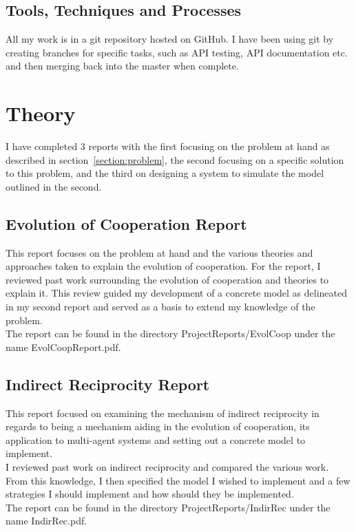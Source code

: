\documentclass[]{final_report}
\begin{document}
\subsection{Tools, Techniques and Processes}
All my work is in a git repository hosted on GitHub. I have been using git by creating branches for specific tasks, such as API testing, API documentation etc. and then merging back into the master when complete.\\

\section{Theory}
I have completed 3 reports with the first focusing on the problem at hand as described in section~\ref{section:problem}, the second focusing on a specific solution to this problem, and the third on designing a system to simulate the model outlined in the second.

\subsection{Evolution of Cooperation Report}
\label{sub:evolcoop}
This report focuses on the problem at hand and the various theories and approaches taken to explain the evolution of cooperation. For the report, I reviewed past work surrounding the evolution of cooperation and theories to explain it. This review guided my development of a concrete model as delineated in my second report and served as a basis to extend my knowledge of the problem.\\
The report can be found in the directory ProjectReports/EvolCoop under the name EvolCoopReport.pdf.

\subsection{Indirect Reciprocity Report}
\label{sub:indirrec}
This report focused on examining the mechanism of indirect reciprocity in regards to being a mechanism aiding in the evolution of cooperation, its application to multi-agent systems and setting out a concrete model to implement.\\
I reviewed past work on indirect reciprocity and compared the various work. From this knowledge, I then specified the model I wished to implement and a few strategies I should implement and how should they be implemented.\\
The report can be found in the directory ProjectReports/IndirRec under the name IndirRec.pdf.
\end{document}
